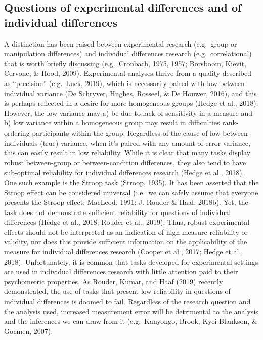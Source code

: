 \documentclass[english,,man,floatsintext]{apa6}
\begin{document}
\hypertarget{questions-of-experimental-differences-and-of-individual-differences}{%
\subsection{Questions of experimental differences and of individual differences}\label{questions-of-experimental-differences-and-of-individual-differences}}

A distinction has been raised between experimental research (e.g.~group or manipulation differences) and individual differences research (e.g.~correlational) that is worth briefly discussing (e.g.~Cronbach, 1975, 1957; Borsboom, Kievit, Cervone, \& Hood, 2009). Experimental analyses thrive from a quality described as \enquote{precision} (e.g.~Luck, 2019), which is necessarily paired with low between-individual variance (De Schryver, Hughes, Rosseel, \& De Houwer, 2016), and this is perhaps reflected in a desire for more homogeneous groups (Hedge et al., 2018). However, the low variance may a) be due to lack of sensitivity in a measure and b) low variance within a homogeneous group may result in difficulties rank-ordering participants within the group. Regardless of the cause of low between-individuals (true) variance, when it's paired with any amount of error variance, this can easily result in low reliability. While it is clear that many tasks display robust between-group or between-condition differences, they also tend to have sub-optimal reliability for individual differences research (Hedge et al., 2018). One such example is the Stroop task (Stroop, 1935). It has been asserted that the Stroop effect can be considered universal (i.e.~we can safely assume that everyone presents the Stroop effect; MacLeod, 1991; J. Rouder \& Haaf, 2018b). Yet, the task does not demonstrate sufficient reliability for questions of individual differences (Hedge et al., 2018; Rouder et al., 2019). Thus, robust experimental effects should not be interpreted as an indication of high measure reliability or validity, nor does this provide sufficient information on the applicability of the measure for individual differences research (Cooper et al., 2017; Hedge et al., 2018). Unfortunately, it is common that tasks developed for experimental settings are used in individual differences research with little attention paid to their psychometric properties. As Rouder, Kumar, and Haaf (2019) recently demonstrated, the use of tasks that present low reliability in questions of individual differences is doomed to fail. Regardless of the research question and the analysis used, increased measurement error will be detrimental to the analysis and the inferences we can draw from it (e.g.~Kanyongo, Brook, Kyei-Blankson, \& Gocmen, 2007).
\end{document}
